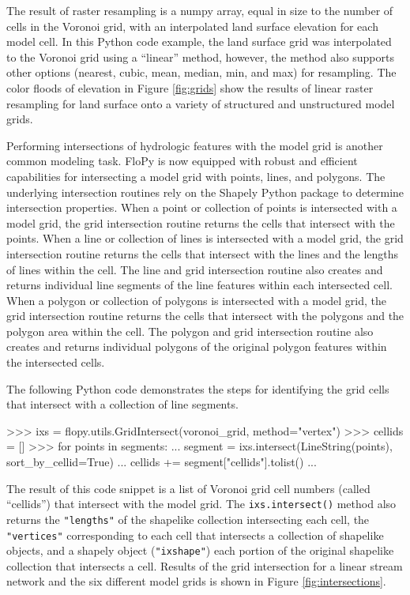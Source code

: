 \documentclass[11pt, oneside]{article}  	%
\begin{document}
\noindent The result of raster resampling is a numpy array, equal in size to the number of cells in the Voronoi grid, with an interpolated land surface elevation for each model cell. In this Python code example, the land surface grid was interpolated to the Voronoi grid using a ``linear'' method, however, the method also supports other options (nearest, cubic, mean, median, min, and max) for resampling. The color floods of elevation in Figure \ref{fig:grids} show the results of linear raster resampling for land surface onto a variety of structured and unstructured model grids.

Performing intersections of hydrologic features with the model grid is another common modeling task. FloPy is now equipped with robust and efficient capabilities for intersecting a model grid with points, lines, and polygons. The underlying intersection routines rely on the Shapely Python package \citep{shapely-gillies} to determine intersection properties. When a point or collection of points is intersected with a model grid, the grid intersection routine returns the cells that intersect with the points. When a line or collection of lines is intersected with a model grid, the grid intersection routine returns the cells that intersect with the lines and the lengths of lines within the cell. The line and grid intersection routine also creates and returns individual line segments of the line features within each intersected cell. When a polygon or collection of polygons is intersected with a model grid, the grid intersection routine returns the cells that intersect with the polygons and the polygon area within the cell. The polygon and grid intersection routine also creates and returns individual polygons of the original polygon features within the intersected cells.

The following Python code demonstrates the steps for identifying the grid cells that intersect with a collection of line segments.

\begin{python}
>>> ixs = flopy.utils.GridIntersect(voronoi_grid, method="vertex")
>>> cellids = []
>>> for points in segments:
...   segment = ixs.intersect(LineString(points), sort_by_cellid=True)
...   cellids += segment["cellids"].tolist()
...
\end{python}

\noindent The result of this code snippet is a list of Voronoi grid cell numbers (called ``cellids'') that intersect with the model grid.  The \texttt{ixs.intersect()} method also returns the \texttt{"lengths"} of the shapelike collection intersecting each cell, the \texttt{"vertices"} corresponding to each cell that intersects a collection of shapelike objects, and a shapely object (\texttt{"ixshape"}) each portion of the original shapelike collection that intersects a cell. Results of the grid intersection for a linear stream network and the six different model grids is shown in Figure \ref{fig:intersections}.
\end{document}

